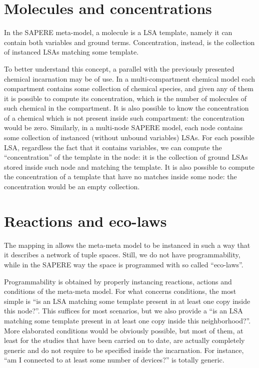 \documentclass[12pt,a4paper,twoside,openright]{book}
\begin{document}
\section{Molecules and concentrations}
\label{alchemist-molecule-concentration}

In the SAPERE meta-model, a molecule is a LSA template, namely it can contain both variables and ground terms.
%
Concentration, instead, is the collection of instanced LSAs matching some template.

To better understand this concept, a parallel with the previously presented chemical incarnation may be of use.
%
In a multi-compartment chemical model each compartment contains some collection of chemical species, and given any of them it is possible to compute its concentration, which is the number of molecules of such chemical in the compartment.
%
It is also possible to know the concentration of a chemical which is not present inside such compartment: the concentration would be zero.
%
Similarly, in a multi-node SAPERE model, each node contains some collection of instanced (without unbound variables) LSAs.
%
For each possible LSA, regardless the fact that it contains variables, we can compute the ``concentration'' of the template in the node: it is the collection of ground LSAs stored inside such node and matching the template.
%
It is also possible to compute the concentration of a template that have no matches inside some node: the concentration would be an empty collection.

\section{Reactions and eco-laws}

The mapping in  allows the meta-meta model to be instanced in such a way that it describes a network of tuple spaces.
%
Still, we do not have programmability, while in the SAPERE way the space is programmed with so called ``eco-laws''.

Programmability is obtained by properly instancing reactions, actions and conditions of the meta-meta model.
%
For what concerns conditions, the most simple is ``is an LSA matching some template present in at least one copy inside this node?''.
%
This suffices for most scenarios, but we also provide a ``is an LSA matching some template present in at least one copy inside this neighborhood?''.
%
More elaborated conditions would be obviously possible, but most of them, at least for the studies that have been carried on to date, are actually completely generic and do not require to be specified inside the incarnation.
%
For instance, ``am I connected to at least some number of devices?'' is totally generic.
\end{document}
